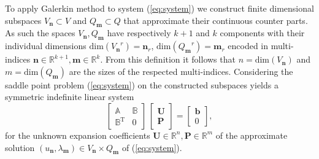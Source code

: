 \documentclass{marine_2015}
\newcommand{\Uvec}{\ensuremath{\mathbf{U}}}
\newcommand{\Pvec}{\ensuremath{\mathbf{P}}}
\newcommand{\Vh}{\ensuremath{V_{\mathbf{n}}}}
\newcommand{\Qh}{\ensuremath{Q_{\mathbf{m}}}}
\begin{document}
To apply Galerkin method to system (\ref{eq:system}) we construct finite dimensional
subspaces $\Vh\subset V$ and $\Qh\subset Q$ that approximate their continuous
counter parts. As such the spaces $\Vh, \Qh$ have respectively $k+1$ and $k$
components with their individual dimensions
$\text{dim}\left(\Vh^r\right)=\mathbf{n}_r$, $\text{dim}\left(\Qh^r\right)=\mathbf{m}_r$ 
encoded in multi-indices $\mathbf{n}\in\mathbb{R}^{k+1}, \mathbf{m}\in\mathbb{R}^k$.
From this definition it follows that $n=\text{dim}\left(\Vh\right)$ and $m=\text{dim}\left(\Qh\right)$
are the sizes of the respected multi-indices. Considering the saddle point
problem (\ref{eq:system}) on the constructed subspaces yields a symmetric
indefinite linear system
\[
  \label{eq:sysAB}
    \begin{bmatrix}
      \mathbb{A} & \mathbb{B} \\
      \mathbb{B}^{\text{T}} & 0
    \end{bmatrix}
    \,
    \begin{bmatrix}
      \mathbf{U} \\
      \mathbf{P}
    \end{bmatrix}
    =
    \begin{bmatrix}
      \mathbf{b}\\
      0
    \end{bmatrix},
\]
for the unknown expansion coefficients $\Uvec\in\mathbb{R}^n,
\Pvec\in\mathbb{R}^m$ of the approximate solution
$\left(u_\mathbf{n}, \lambda_{\mathbf{m}}\right)\in \Vh \times \Qh$ of
(\ref{eq:system}).
\end{document}

